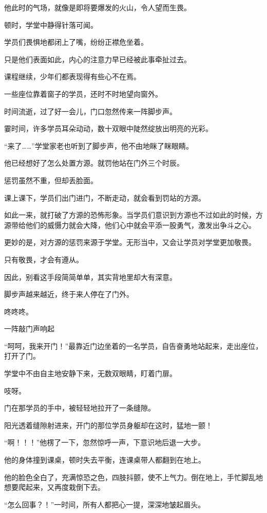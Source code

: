 \begin{this_body}
他此时的气场，就像是即将要爆发的火山，令人望而生畏。

顿时，学堂中静得针落可闻。

学员们畏惧地都闭上了嘴，纷纷正襟危坐着。

只是他们表面如此，内心的注意力早已经被此事牵扯过去。

课程继续，少年们都表现得有些心不在焉。

一些座位靠着窗子的学员，还时不时地望向窗外。

时间流逝，过了好一会儿，门口忽然传来一阵脚步声。

霎时间，许多学员耳朵动动，数十双眼中陡然绽放出明亮的光彩。

“来了……”学堂家老也听到了脚步声，他不由地眯了眯眼睛。

他已经想好了怎么处置方源。就罚他站在门外三个时辰。

惩罚虽然不重，但却丢脸面。

课上课下，学员们出门进门，不断走动，就会看到罚站的方源。

如此一来，就打破了方源的恐怖形象。当学员们意识到方源也不过如此的时候，方源带给他们的威慑力就会大降，他们心中就会平添一股勇气，激发出争斗之心。

更妙的是，对方源的惩罚来源于学堂。无形当中，又会让学员对学堂更加敬畏。

只有敬畏，才会有遵从。

因此，别看这手段简简单单，其实背地里却大有深意。

脚步声越来越近，终于来人停在了门外。

咚咚咚。

一阵敲门声响起

“呵呵，我来开门！”最靠近门边坐着的一名学员，自告奋勇地站起来，走出座位，打开了门。

学堂中不由自主地安静下来，无数双眼睛，盯着门扉。

吱呀。

门在那学员的手中，被轻轻地拉开了一条缝隙。

阳光透着缝隙射进来，开门的那位学员身躯却在这时，猛地一颤！

“啊！！！”他楞了一下，忽然惊呼一声，下意识地后退一大步。

他的身体撞到课桌，顿时失去平衡，连课桌带人都翻到在地上。

他的脸色全白了，充满惊恐之色，四肢抖颤，使不上气力。倒在地上，手忙脚乱地想要爬起来，又再度栽倒下去。

“怎么回事？！”一时间，所有人都把心一提，深深地皱起眉头。


\end{this_body}
